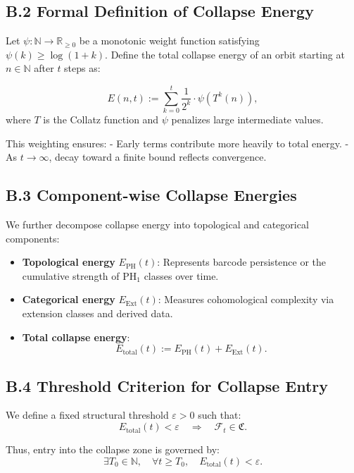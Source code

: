 \documentclass[11pt]{article}
\begin{document}
\subsection*{B.2 Formal Definition of Collapse Energy}

Let \( \psi : \mathbb{N} \to \mathbb{R}_{\geq 0} \) be a monotonic weight function satisfying \( \psi(k) \geq \log(1 + k) \).  
Define the total collapse energy of an orbit starting at \( n \in \mathbb{N} \) after \( t \) steps as:

\[
E(n, t) := \sum_{k=0}^{t} \frac{1}{2^k} \cdot \psi(T^k(n)),
\]
where \( T \) is the Collatz function and \( \psi \) penalizes large intermediate values.

This weighting ensures:
- Early terms contribute more heavily to total energy.
- As \( t \to \infty \), decay toward a finite bound reflects convergence.

\subsection*{B.3 Component-wise Collapse Energies}

We further decompose collapse energy into topological and categorical components:

\begin{itemize}
  \item \textbf{Topological energy} \( E_{\mathrm{PH}}(t) \):  
  Represents barcode persistence or the cumulative strength of \( \mathrm{PH}_1 \) classes over time.

  \item \textbf{Categorical energy} \( E_{\mathrm{Ext}}(t) \):  
  Measures cohomological complexity via extension classes and derived data.

  \item \textbf{Total collapse energy}:
  \[
  E_{\mathrm{total}}(t) := E_{\mathrm{PH}}(t) + E_{\mathrm{Ext}}(t).
  \]
\end{itemize}

\subsection*{B.4 Threshold Criterion for Collapse Entry}

We define a fixed structural threshold \( \varepsilon > 0 \) such that:
\[
E_{\mathrm{total}}(t) < \varepsilon \quad \Longrightarrow \quad \mathcal{F}_t \in \mathfrak{C}.
\]

Thus, entry into the collapse zone is governed by:
\[
\exists T_0 \in \mathbb{N}, \quad \forall t \geq T_0,\quad E_{\mathrm{total}}(t) < \varepsilon.
\]
\end{document}
